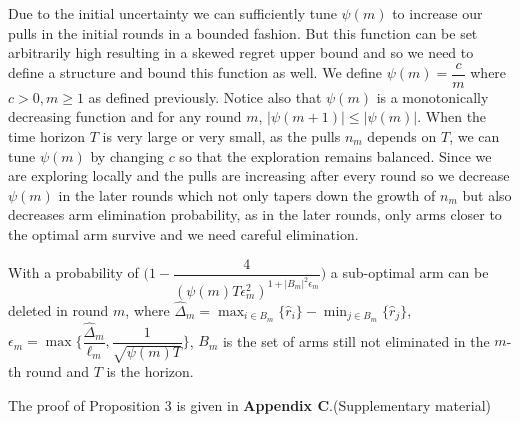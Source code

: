 \begin{remark}
	Due to the initial uncertainty we can sufficiently tune $\psi(m)$ to increase our pulls in the initial rounds in a bounded fashion. But this function can be set arbitrarily high resulting in a skewed regret upper bound and so we need to define a structure and bound this function as well. We define $\psi(m)=\dfrac{c}{m}$ where $c>0, m\geq 1$ as defined previously. Notice also that $\psi(m)$ is a monotonically decreasing function and for any round $m$, $|\psi(m+1)|\leq |\psi(m)|$. 
When the time horizon $T$ is very large or very small, as the pulls $n_{m}$ depends on $T$, we can tune $\psi(m)$ by changing $c$ so that the exploration remains balanced. Since we are exploring locally and the pulls are increasing after every round so we decrease $\psi(m)$ in the later rounds which not only tapers down the growth of $n_{m}$ but also decreases arm elimination probability, as in the later rounds, only arms closer to the optimal arm survive and we need careful elimination.
\end{remark}
	
	
	

\begin{proposition}
With a probability of $\bigg(1-\dfrac{4}{(\psi(m)T\epsilon_{m}^{2})^{1+|B_{m}|^{2}\epsilon_{m}}}\bigg)$ a sub-optimal arm can be deleted in round $m$, where $\hat{\Delta}_{m}=\max_{i\in B_{m}}{\lbrace\hat{r}_{i}\rbrace}-\min_{j\in B_{m}}{\lbrace\hat{r}_{j}\rbrace}$,  $\epsilon_{m}=\max{\bigg\lbrace\dfrac{\hat{\Delta}_{m}}{\ell_{m}}, \dfrac{1}{\sqrt{\psi{(m)T}}}\bigg\rbrace}$, $B_{m}$ is the set of arms still not eliminated in the $m$-th round and $T$ is the horizon.
\end{proposition}

	The proof of Proposition 3 is given in \textbf{Appendix C}.(Supplementary material)

